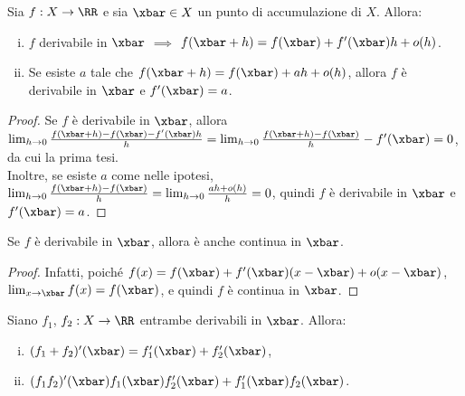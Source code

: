 \documentclass[11pt]{article}
\begin{document}
	\begin{proposition}
		Sia $f : X \to \RR$ e sia $\xbar \in X$ un punto di accumulazione di $X$. Allora:
		
		\begin{enumerate}[(i)]
			\item $f$ derivabile in $\xbar$ $\implies$ $f(\xbar + h) = f(\xbar) + f'(\xbar) h + o(h)$.
			\item Se esiste $a$ tale che $f(\xbar + h) = f(\xbar) + ah + o(h)$,
			allora $f$ è derivabile in $\xbar$ e $f'(\xbar) = a$.
		\end{enumerate}
	\end{proposition}

	\begin{proof}
		Se $f$ è derivabile in $\xbar$, allora $\lim_{h \to 0} \frac{f(\xbar + h) - f(\xbar) - f'(\xbar) h}{h} = \lim_{h \to 0} \frac{f(\xbar + h) - f(\xbar)}{h} - f'(\xbar) = 0$, da cui la prima tesi. \\
		
		Inoltre, se esiste $a$ come nelle ipotesi, $\lim_{h \to 0} \frac{f(\xbar + h) - f(\xbar)}{h} =\lim_{h \to 0} \frac{ah + o(h)}{h} = 0$, quindi $f$ è derivabile in $\xbar$ e $f'(\xbar) = a$.
	\end{proof}

	\begin{corollary}
		Se $f$ è derivabile in $\xbar$, allora è anche continua in $\xbar$.
	\end{corollary}

	\begin{proof}
		Infatti, poiché $f(x) = f(\xbar) + f'(\xbar) (x - \xbar) + o(x-\xbar)$,
		$\lim_{x \to \xbar} f(x) = f(\xbar)$, e quindi $f$ è continua in $\xbar$. %
	\end{proof}

	\begin{proposition}
		Siano $f_1$, $f_2 : X \to \RR$ entrambe derivabili in
		$\xbar$. Allora:
		
		\begin{enumerate}[(i)]
			\item $(f_1 + f_2)'(\xbar) = f_1'(\xbar) + f_2'(\xbar)$,
			\item $(f_1f_2)'(\xbar) f_1(\xbar) f_2'(\xbar) + f_1'(\xbar) f_2(\xbar)$.
		\end{enumerate}
	\end{proposition}
\end{document}

